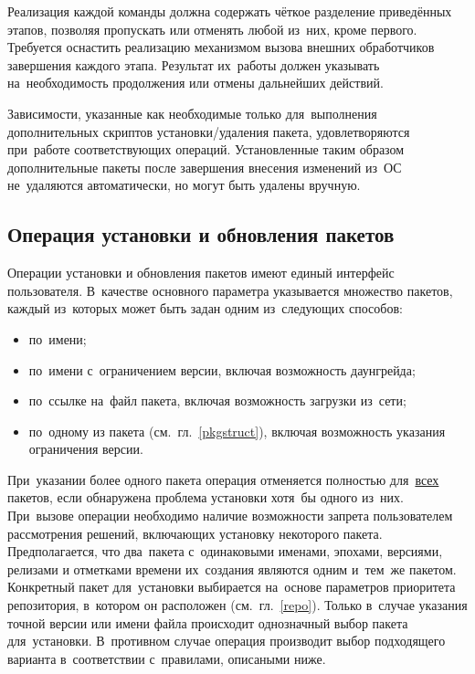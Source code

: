 Реализация каждой команды должна содержать чёткое разделение приведённых этапов,
позволяя пропускать или отменять любой из~них, кроме первого.
Требуется оснастить реализацию механизмом вызова внешних обработчиков завершения каждого этапа.
Результат их~работы должен указывать на~необходимость продолжения или отмены дальнейших действий.

Зависимости, указанные как необходимые только для~выполнения дополнительных скриптов установки/удаления пакета,
удовлетворяются при~работе соответствующих операций.
Установленные таким образом дополнительные пакеты после завершения внесения изменений из~ОС не~удаляются автоматически,
но могут быть удалены вручную.

\subsection{Операция установки и обновления пакетов}

Операции установки и обновления пакетов имеют единый интерфейс пользователя.
В~качестве основного параметра указывается множество пакетов, каждый из~которых может быть  задан одним из~следующих способов:

\begin{itemize}
\item {по~имени;}
\item {по~имени с~ограничением версии, включая возможность даунгрейда;}
\item {по~ссылке на~файл пакета, включая возможность загрузки из~сети;}
\item{по~одному из  пакета (см.~гл.~\ref{pkgstruct}), включая возможность указания ограничения версии.}
\end{itemize}

При~указании более одного пакета операция отменяется полностью для~\underline{всех} пакетов, 
если обнаружена проблема установки хотя~бы одного из~них.
При~вызове операции необходимо наличие возможности запрета пользователем рассмотрения решений, 
включающих установку некоторого пакета. 
Предполагается, что два~пакета с~одинаковыми именами, эпохами, версиями, релизами и отметками времени их~создания являются одним и~тем~же пакетом.
Конкретный пакет для~установки выбирается на~основе параметров приоритета репозитория, в~котором  он расположен (см.~гл.~\ref{repo}).
Только в~случае указания точной версии или имени файла происходит однозначный выбор пакета для~установки.
В~противном случае операция производит выбор подходящего варианта в~соответствии с~правилами, описаными ниже.

